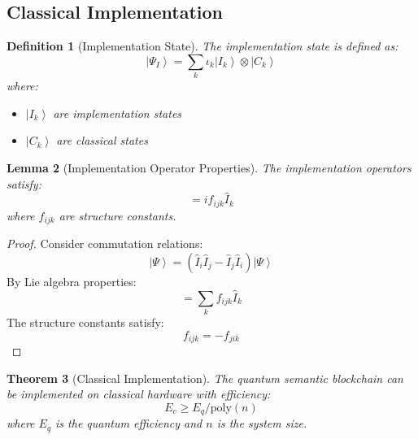 \documentclass[12pt]{article}
\newcommand{\ket}[1]{\left|#1\right\rangle}
\newcommand{\op}[1]{\hat{#1}}
\newtheorem{theorem}{Theorem}[section]
\newtheorem{lemma}[theorem]{Lemma}
\newtheorem{definition}[theorem]{Definition}
\begin{document}
\subsection{Classical Implementation}
\begin{definition}[Implementation State]
The implementation state is defined as:
\begin{equation}
\ket{\Psi_I} = \sum_k \iota_k\ket{I_k} \otimes \ket{C_k}
\end{equation}
where:
\begin{itemize}
\item $\ket{I_k}$ are implementation states
\item $\ket{C_k}$ are classical states
\end{itemize}
\end{definition}
\begin{lemma}[Implementation Operator Properties]
The implementation operators satisfy:
\begin{equation}
[\op{I}_i,\op{I}_j] = if_{ijk}\op{I}_k
\end{equation}
where $f_{ijk}$ are structure constants.
\end{lemma}
\begin{proof}
Consider commutation relations:
\begin{equation}
[\op{I}_i,\op{I}_j]\ket{\Psi} = (\op{I}_i\op{I}_j - \op{I}_j\op{I}_i)\ket{\Psi}
\end{equation}
By Lie algebra properties:
\begin{equation}
[\op{I}_i,\op{I}_j] = \sum_k f_{ijk}\op{I}_k
\end{equation}
The structure constants satisfy:
\begin{equation}
f_{ijk} = -f_{jik}
\end{equation}
\end{proof}
\begin{theorem}[Classical Implementation]
The quantum semantic blockchain can be implemented on classical hardware with efficiency:
\begin{equation}
E_c \geq E_q/\text{poly}(n)
\end{equation}
where $E_q$ is the quantum efficiency and $n$ is the system size.
\end{theorem}
\end{document}
